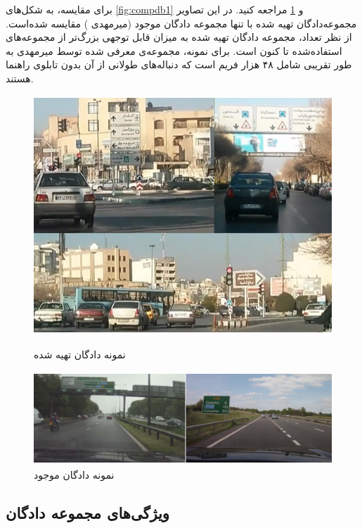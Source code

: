 برای مقایسه، به شکل‌های
 \ref{fig:compdb1}
  و \ref{fig:compdb2}
  مراجعه کنید. در این تصاویر مجموعه‌دادگان تهیه شده با تنها مجموعه دادگان موجود (میرمهدی \cite{Greenhalgh2015}) مقایسه شده‌است. از نظر تعداد، مجموعه دادگان تهیه شده به میزان قابل توجهی بزرگ‌تر از مجموعه‌های استفاده‌شده تا کنون است. برای نمونه، مجموعه‌ی معرفی شده توسط میرمهدی به طور تقریبی شامل ۴۸ هزار فریم است که دنباله‌های طولانی از آن بدون تابلوی راهنما هستند. 
\begin{figure}[p]
\centering
\includegraphics[height=9cm]{Figures/real.png}
\caption{نمونه دادگان تهیه شده}
\label{fig:compdb1}
\vspace{3mm}
\includegraphics[height=3.5cm]{Figures/mirmdb1.png}
\caption{نمونه دادگان موجود}
\label{fig:compdb2}
\end{figure}

\subsection{ویژگی‌های مجموعه دادگان}
\label{subsec:dbattr}


